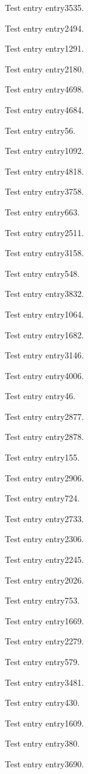 Test entry \gls{entry3535}.

Test entry \gls{entry2494}.

Test entry \gls{entry1291}.

Test entry \gls{entry2180}.

Test entry \gls{entry4698}.

Test entry \gls{entry4684}.

Test entry \gls{entry56}.

Test entry \gls{entry1092}.

Test entry \gls{entry4818}.

Test entry \gls{entry3758}.

Test entry \gls{entry663}.

Test entry \gls{entry2511}.

Test entry \gls{entry3158}.

Test entry \gls{entry548}.

Test entry \gls{entry3832}.

Test entry \gls{entry1064}.

Test entry \gls{entry1682}.

Test entry \gls{entry3146}.

Test entry \gls{entry4006}.

Test entry \gls{entry46}.

Test entry \gls{entry2877}.

Test entry \gls{entry2878}.

Test entry \gls{entry155}.

Test entry \gls{entry2906}.

Test entry \gls{entry724}.

Test entry \gls{entry2733}.

Test entry \gls{entry2306}.

Test entry \gls{entry2245}.

Test entry \gls{entry2026}.

Test entry \gls{entry753}.

Test entry \gls{entry1669}.

Test entry \gls{entry2279}.

Test entry \gls{entry579}.

Test entry \gls{entry3481}.

Test entry \gls{entry430}.

Test entry \gls{entry1609}.

Test entry \gls{entry380}.

Test entry \gls{entry3690}.

